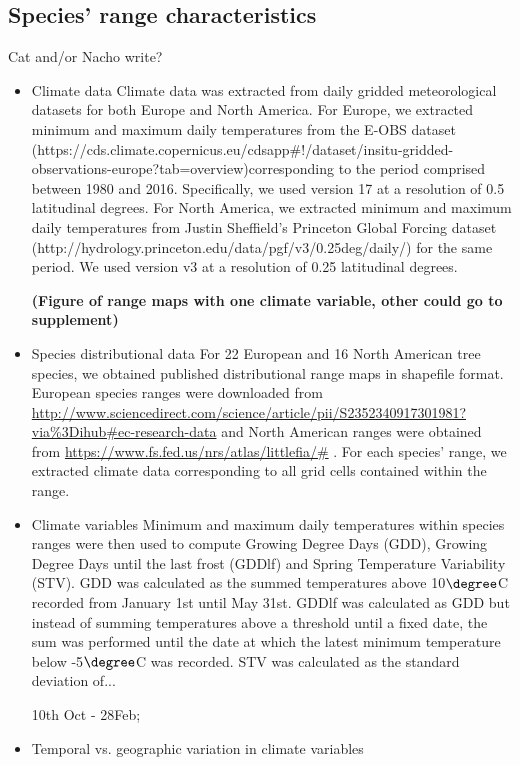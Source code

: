 \documentclass[12pt]{article}\usepackage[]{graphicx}\usepackage[]{color}
\begin{document}
\subsection*{Species' range characteristics}
Cat and/or Nacho write?\\
\begin{itemize}
\item Climate data
Climate data was extracted from daily gridded meteorological datasets for both Europe and North America. For Europe, we extracted minimum and maximum daily temperatures from the E-OBS dataset (https://cds.climate.copernicus.eu/cdsapp#!/dataset/insitu-gridded-observations-europe?tab=overview)corresponding to the period comprised between 1980 and 2016. Specifically, we used version 17 at a resolution of 0.5 latitudinal degrees. For North America, we extracted minimum and maximum daily temperatures from Justin Sheffield’s Princeton Global Forcing dataset (http://hydrology.princeton.edu/data/pgf/v3/0.25deg/daily/) for the same period. We used version v3 at a resolution of 0.25 latitudinal degrees. 

\textbf{(Figure of range maps with one climate variable, other could go to supplement)}

\item Species distributional data
For 22 European and 16 North American tree species, we obtained published distributional range maps in shapefile format. European species ranges were downloaded from \url{http://www.sciencedirect.com/science/article/pii/S2352340917301981?via\%3Dihub#ec-research-data} \citep{Caudullo2017} and North American ranges were obtained from \url{https://www.fs.fed.us/nrs/atlas/littlefia/#} \citep{Prasad2003}. For each species' range, we extracted climate data corresponding to all grid cells contained within the range.

\item Climate variables
Minimum and maximum daily temperatures within species ranges were then used to compute Growing Degree Days (GDD), Growing Degree Days until the last frost (GDDlf) and Spring Temperature Variability (STV). GDD was calculated as the summed temperatures above 10$\degree$C recorded from January 1st until May 31st. GDDlf was calculated as GDD but instead of summing temperatures above a threshold until a fixed date, the sum was performed until the date at which the latest minimum temperature below -5$\degree$C was recorded. STV was calculated as the standard deviation of...            




10th Oct - 28Feb;
\item Temporal vs. geographic variation in climate variables


\end{itemize}
\end{document}
